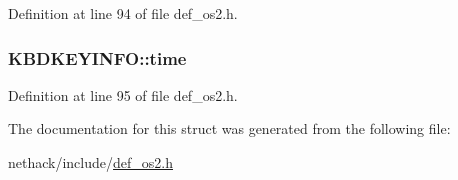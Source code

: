 Definition at line 94 of file def\+\_\+os2.\+h.

\hypertarget{structKBDKEYINFO_a9dd7edd2c1844356fa23edd0ca4fcc28}{
\subsubsection[{time}]{ K\+B\+D\+K\+E\+Y\+I\+N\+F\+O\+::time}}\label{structKBDKEYINFO_a9dd7edd2c1844356fa23edd0ca4fcc28}


Definition at line 95 of file def\+\_\+os2.\+h.



The documentation for this struct was generated from the following file\+:\begin{DoxyCompactItemize}
\item 
nethack/include/\hyperlink{def__os2_8h}{def\+\_\+os2.\+h}\end{DoxyCompactItemize}
